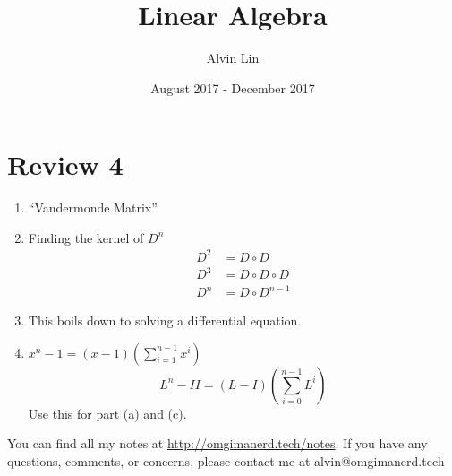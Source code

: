 \documentclass{math}
\title{Linear Algebra}
\author{Alvin Lin}
\date{August 2017 - December 2017}
\begin{document}
\maketitle

\section*{Review 4}
\begin{enumerate}
  \item ``Vandermonde Matrix''
  \item Finding the kernel of \( D^n \)
  \begin{align*}
    D^2 &= D\circ D \\
    D^3 &= D\circ D\circ D \\
    D^n &= D\circ D^{n-1}
  \end{align*}
  \item This boils down to solving a differential equation.
  \item \( x^n-1 = (x-1)(\sum_{i=1}^{n-1}x^i) \)
  \[ L^n-II = (L-I)(\sum_{i=0}^{n-1}L^i) \]
  Use this for part (a) and (c).
\end{enumerate}

\begin{center}
  You can find all my notes at \url{http://omgimanerd.tech/notes}. If you have
  any questions, comments, or concerns, please contact me at
  alvin@omgimanerd.tech
\end{center}
\end{document}
